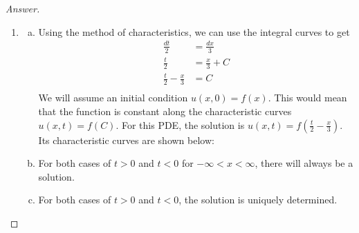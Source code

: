 \documentclass{article}
\theoremstyle{definition}
\renewcommand\qedsymbol{$\blacksquare$}
\newenvironment{ans}{\begin{proof}[Answer]\renewcommand{\qedsymbol}{}}{\end{proof}}
\begin{document}
	\begin{ans}
		\begin{enumerate}[(1), series=answers]
			
			\item \begin{enumerate}[a)]
                    \item Using the method of characteristics, we can use the integral curves to get
                    \begin{align*}
                        \frac{dt}{2} &= \frac{dx}{3}\\
                        \frac{t}{2} &= \frac{x}{3} + C\\
                        \frac{t}{2} - \frac{x}{3} &= C\\
                    \end{align*}
                    We will assume an initial condition $u(x,0) = f(x)$. This would mean that the function is constant along the characteristic curves $u(x,t)=f(C)$. For this PDE, the solution is $\boxed{u(x,t)=f\left(\frac{t}{2} - \frac{x}{3}\right)}$. Its characteristic curves are shown below:

                    \begin{center}
                    \end{center}

                    \item For both cases of $t > 0$ and $t < 0$ for $-\infty < x < \infty$, there will always be a solution.

                    \item For both cases of $t > 0$ and $t < 0$, the solution is uniquely determined.


\end{enumerate}
\end{enumerate}
\end{ans}
\end{document}
